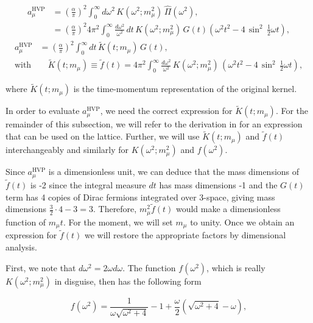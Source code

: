 \documentclass{article}
\numberwithin{equation}{section} %
\begin{document}
\begin{equation*}
\begin{split}
a_\mu^\mathrm{HVP} &= \left(\frac{\alpha}{\pi}\right)^2 \int_0^\infty d\omega^2 \, K(\omega^2;m_\mu^2) \,\hat{\Pi}(\omega^2),\\
&= \left(\frac{\alpha}{\pi}\right)^2 4\pi^2  \int_0^\infty \frac{d\omega^2}{\omega^2} \, dt\, K(\omega^2;m_\mu^2) \,G(t) \left( \omega^2 t^2-4\,\sin^2\, \frac{1}{2}\omega t \right),
\end{split}
\end{equation*}
\begin{equation}
\begin{split}
a_\mu^\mathrm{HVP}&= \left(\frac{\alpha}{\pi}\right)^2  \int_0^\infty dt\, \tilde{K}(t;m_\mu) \,G(t) ,\\
\mathrm{with}& \quad \tilde{K}(t;m_\mu) \equiv \tilde{f}(t) = 4\pi^2 \int_0^\infty \frac{d\omega^2}{\omega^2} \, K(\omega^2;m_\mu^2) \,\left( \omega^2t^2-4\,\sin^2\, \frac{1}{2}\omega t \right),
\end{split}
\label{amu}
\end{equation}

\noindent where $\tilde{K}(t;m_\mu)$ is the time-momentum representation of the original kernel.

In order to evaluate $a_\mu^\mathrm{HVP}$, we need the correct expression for $\tilde{K}(t;m_\mu)$. For the remainder of this subsection, we will refer to the derivation in \cite{dellamorte} for an expression that can be used on the lattice. Further, we will use $\tilde{K}(t;m_\mu)$ and $\tilde{f}(t)$ interchangeably and similarly for $K(\omega^2;m_\mu^2)$ and $f(\omega^2)$. 

Since $a_\mu^\mathrm{HVP}$  is a dimensionless unit, we can deduce that the mass dimensions of $\tilde{f}(t)$ is -2 since the integral measure $dt$ has mass dimensions -1 and the $G(t)$ term has 4 copies of Dirac fermions integrated over 3-space, giving mass dimensions $\frac{3}{2}\cdot 4 - 3 = 3$. Therefore, $m_\mu^2 \tilde{f}(t)$ would make a dimensionless function of $m_\mu t$. For the moment, we will set $m_\mu$ to unity. Once we obtain an expression for $\tilde{f}(t)$ we will restore the appropriate factors by dimensional analysis.

First, we note that $d\omega^2=2\omega d\omega$. The function $f(\omega^2)$, which is really $K(\omega^2;m_\mu^2)$ in disguise, then has the following form 

\begin{equation}
f(\omega^2) = \frac{1}{\omega\sqrt{\omega^2 + 4}} - 1 + \frac{\omega}{2}(\sqrt{\omega^2 + 4} - \omega),
\end{equation}
\end{document}
